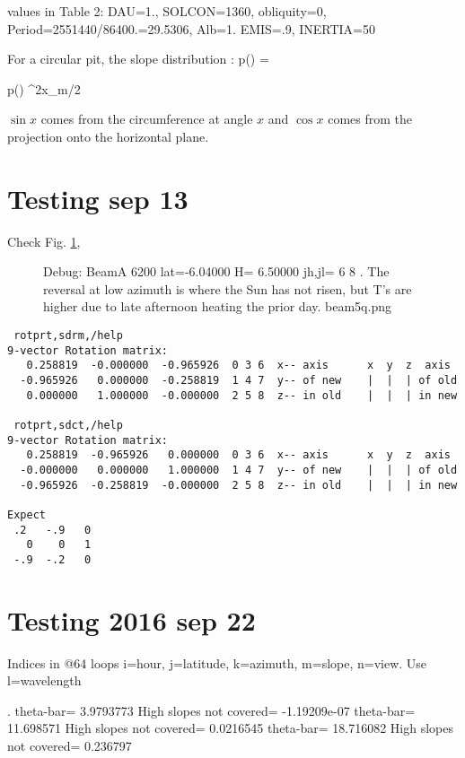 \documentclass{article}
\begin{document}
  values in Table 2: DAU=1., SOLCON=1360, obliquity=0, Period=2551440/86400.=29.5306, Alb=1. EMIS=.9, INERTIA=50

For a circular pit, the slope distribution :
\qbn  p(\theta) =  \qen

\qbn  p(\theta)  {\sin^2x_m/2} \qen

$\sin x$ comes from the circumference at angle $x$ and  $\cos x$ comes from the projection onto the horizontal plane.

\section{Testing sep 13}

Check Fig. \ref{beam5q}, 
\begin{figure}[!ht] 
\caption[Ts vrs azimuth]{Debug: BeamA 6200 lat=-6.04000 H= 6.50000 jh,jl= 6 8 .
  The reversal at low azimuth is where the Sun has not risen, but T's are higher
  due to late afternoon heating the prior day.
\label{beam5q}  beam5q.png }
\end{figure} 

\begin{verbatim}
 rotprt,sdrm,/help
9-vector Rotation matrix:  
   0.258819  -0.000000  -0.965926  0 3 6  x-- axis      x  y  z  axis
  -0.965926   0.000000  -0.258819  1 4 7  y-- of new    |  |  | of old
   0.000000   1.000000  -0.000000  2 5 8  z-- in old    |  |  | in new

 rotprt,sdct,/help
9-vector Rotation matrix:  
   0.258819  -0.965926   0.000000  0 3 6  x-- axis      x  y  z  axis
  -0.000000   0.000000   1.000000  1 4 7  y-- of new    |  |  | of old
  -0.965926  -0.258819  -0.000000  2 5 8  z-- in old    |  |  | in new

Expect      
 .2   -.9   0    
   0    0   1 
 -.9  -.2   0
\end{verbatim} 


\section{Testing 2016 sep 22}
 Indices in @64 loops i=hour, j=latitude, k=azimuth, m=slope, n=view.
 Use l=wavelength

.
\qi theta-bar=       3.9793773 High slopes not covered= -1.19209e-07
\qi theta-bar=       11.698571 High slopes not covered=    0.0216545
\qi theta-bar=       18.716082 High slopes not covered=     0.236797
\end{document}
